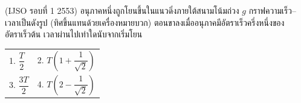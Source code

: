 (IJSO รอบที่ 1 2553) อนุภาคหนึ่งถูกโยนขึ้นในแนวดิ่งภายใต้สนามโน้มถ่วง $g$ กราฟความเร็ว--เวลาเป็นดังรูป (ทิศขึ้นแทนด้วยเครื่องหมายบวก) ตอนขาลงเมื่ออนุภาคมีอัตราเร็วครึ่งหนึ่งของอัตราเร็วต้น เวลาผ่านไปเท่าใดนับจากเริ่มโยน
\begin{center}\end{center}
\par\smallskip\par\smallskip\begin{tabular}{@{}p{.48\linewidth}p{.48\linewidth}@{}}1. $\dfrac{T}{2}$ & 2. $T\left(1+\dfrac{1}{\sqrt{2}}\right)$ \\ 3. $\dfrac{3T}{2}$ & 4. $T\left(2-\dfrac{1}{\sqrt{2}}\right)$\end{tabular}
